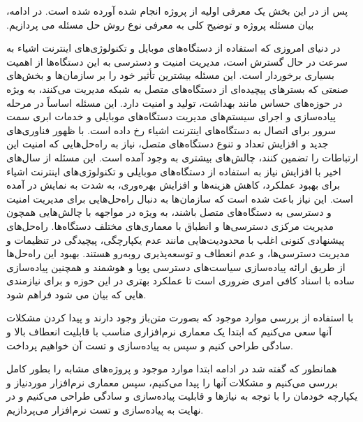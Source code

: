 

‫در ‬‫این‬ ‫بخش‬ ‫یک‬ ‫معرفی‬ ‫اولیه‬ ‫از‬ ‫پروژه‬ ‫انجام‬ ‫شده‬ ‫آورده‬ ‫شده‬ ‫است. ‬‬‫در‬ ‫ادامه‪،‬‬ ‫پس‬ ‫از‬ ‫بیان‬ مسئله ‫پروژه‬ ‫و‬ ‫توضیح‬ ‫کلی‬ ‫به ‫معرفی‬ نوع روش حل مسئله می پردازیم.


در دنیای امروزی که استفاده از دستگاه‌های موبایل و تکنولوژی‌های اینترنت اشیاء  به سرعت در حال گسترش است، مدیریت امنیت و دسترسی به این دستگاه‌ها از اهمیت بسیاری برخوردار است. این مسئله بیشترین تأثیر خود را بر سازمان‌ها و بخش‌های صنعتی که بسترهای پیچیده‌ای از دستگاه‌های متصل به شبکه مدیریت می‌کنند، به ویژه در حوزه‌های حساس مانند بهداشت، تولید و امنیت دارد.
این مسئله اساساً در مرحله پیاده‌سازی و اجرای سیستم‌های مدیریت دستگاه‌های موبایلی و خدمات ابری سمت سرور برای اتصال به دستگاه‌های اینترنت اشیاء رخ داده است. با ظهور فناوری‌های جدید و افزایش تعداد و تنوع دستگاه‌های متصل، نیاز به راه‌حل‌هایی که امنیت این ارتباطات را تضمین کنند، چالش‌های بیشتری به وجود آمده است.
این مسئله از سال‌های اخیر با افزایش نیاز به استفاده از دستگاه‌های موبایلی و تکنولوژی‌های اینترنت اشیاء برای بهبود عملکرد، کاهش هزینه‌ها و افزایش بهره‌وری، به شدت به نمایش در آمده است. این نیاز باعث شده است که سازمان‌ها به دنبال راه‌حل‌هایی برای مدیریت امنیت و دسترسی به دستگاه‌های متصل باشند، به ویژه در مواجهه با چالش‌هایی همچون مدیریت مرکزی دسترسی‌ها و انطباق با معماری‌های مختلف دستگاه‌ها.
راه‌حل‌های پیشنهادی کنونی اغلب با محدودیت‌هایی مانند عدم یکپارچگی، پیچیدگی در تنظیمات و مدیریت دسترسی‌ها، و عدم انعطاف و توسعه‌پذیری روبه‌رو هستند. بهبود این راه‌حل‌ها از طریق ارائه پیاده‌سازی سیاست‌های دسترسی پویا و هوشمند و همچنین پیاده‌سازی ساده با اسناد کافی امری ضروری است تا عملکرد بهتری در این حوزه و برای نیازمندی هایی که بیان می شود فراهم شود.



با استفاده از بررسی موارد موجود که بصورت متن‌باز وجود دارند و پیدا کردن مشکلات آنها سعی می‌کنیم که ابتدا یک معماری نرم‌افزاری مناسب با قابلیت انعطاف بالا و سادگی طراحی کنیم و سپس به پیاده‌سازی و تست آن خواهیم پرداخت.



همانطور که گفته شد در ادامه ابتدا موارد موجود و پروژه‌های مشابه را بطور کامل بررسی می‌کنیم و مشکلات آنها را پیدا می‌کنیم، سپس معماری نرم‌افزار موردنیاز و یکپارچه خودمان را با توجه به نیازها و قابلیت پیاده‌سازی و سادگی طراحی می‌کنیم و در نهایت به پیاده‌سازی و تست نرم‌افزار می‌پردازیم.
